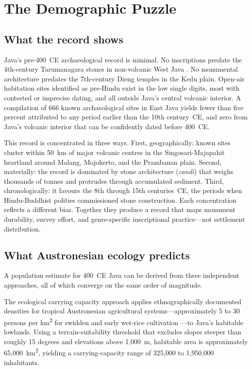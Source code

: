 \documentclass[12pt,a4paper]{article}
\begin{document}
\section{The Demographic Puzzle}
\label{sec:puzzle}

\subsection{What the record shows}

Java's pre-400~CE archaeological record is minimal. No inscriptions predate the 4th-century Tarumanagara stones in non-volcanic West Java \citep{vogel1918,coedes1968}. No monumental architecture predates the 7th-century Dieng temples in the Kedu plain. Open-air habitation sites identified as pre-Hindu exist in the low single digits, most with contested or imprecise dating, and all outside Java's central volcanic interior. A compilation of 666 known archaeological sites in East Java \citep[P1-core]{amien_p1core} yields fewer than five percent attributed to any period earlier than the 10th century~CE, and zero from Java's volcanic interior that can be confidently dated before 400~CE.

This record is concentrated in three ways. First, geographically: known sites cluster within 50~km of major volcanic centres in the Singosari-Majapahit heartland around Malang, Mojokerto, and the Prambanan plain. Second, materially: the record is dominated by stone architecture (\textit{candi}) that weighs thousands of tonnes and protrudes through accumulated sediment. Third, chronologically: it favours the 8th through 15th centuries~CE, the periods when Hindu-Buddhist polities commissioned stone construction. Each concentration reflects a different bias. Together they produce a record that maps monument durability, survey effort, and genre-specific inscriptional practice---not settlement distribution.

\subsection{What Austronesian ecology predicts}

A population estimate for 400~CE Java can be derived from three independent approaches, all of which converge on the same order of magnitude.

The ecological carrying capacity approach applies ethnographically documented densities for tropical Austronesian agricultural systems---approximately 5 to 30 persons per km\textsuperscript{2} for swidden and early wet-rice cultivation \citep{bellwood2017,kirch2000,baylisssmith1980}---to Java's habitable lowlands. Using a terrain-suitability threshold that excludes slopes steeper than roughly 15 degrees and elevations above 1{,}000~m, habitable area is approximately 65{,}000~km\textsuperscript{2}, yielding a carrying-capacity range of 325{,}000 to 1{,}950{,}000 inhabitants.
\end{document}
